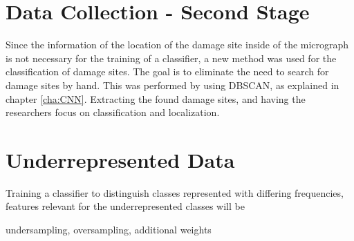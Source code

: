 \section{Data Collection - Second Stage}

Since the information of the location of the damage site inside of the micrograph is not necessary for the training of a classifier, a new method was used for the classification of damage sites. The goal is to eliminate the need to search for damage sites by hand. This was performed by using DBSCAN, as explained in chapter \ref{cha:CNN}. Extracting the found damage sites, and having the researchers focus on classification and localization. \\

\section{Underrepresented Data}



Training a classifier to distinguish classes represented with differing frequencies, features relevant for the underrepresented classes will be 



undersampling, oversampling, additional weights






